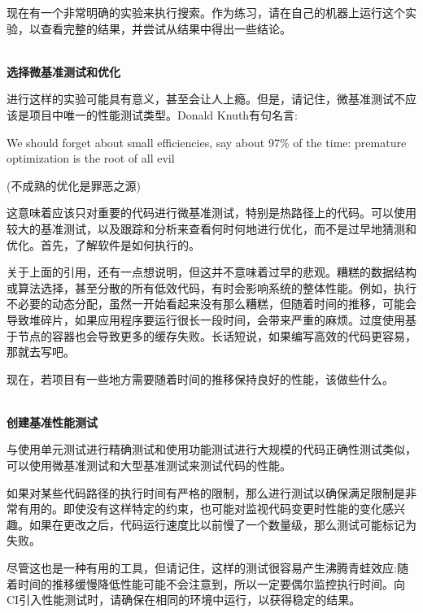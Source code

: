现在有一个非常明确的实验来执行搜索。作为练习，请在自己的机器上运行这个实验，以查看完整的结果，并尝试从结果中得出一些结论。

\hspace*{\fill} \\ %
\noindent
\textbf{选择微基准测试和优化}

进行这样的实验可能具有意义，甚至会让人上瘾。但是，请记住，微基准测试不应该是项目中唯一的性能测试类型。Donald Knuth有句名言:

\begin{center}
We should forget about small efficiencies, say about 97\% of the time: premature optimization is the root of all evil	

(不成熟的优化是罪恶之源)
\end{center}

这意味着应该只对重要的代码进行微基准测试，特别是热路径上的代码。可以使用较大的基准测试，以及跟踪和分析来查看何时何地进行优化，而不是过早地猜测和优化。首先，了解软件是如何执行的。

\begin{tcolorbox}[colback=blue!5!white,colframe=blue!75!black, title=Note]
\hspace*{0.7cm}关于上面的引用，还有一点想说明，但这并不意味着过早的悲观。糟糕的数据结构或算法选择，甚至分散的所有低效代码，有时会影响系统的整体性能。例如，执行不必要的动态分配，虽然一开始看起来没有那么糟糕，但随着时间的推移，可能会导致堆碎片，如果应用程序要运行很长一段时间，会带来严重的麻烦。过度使用基于节点的容器也会导致更多的缓存失败。长话短说，如果编写高效的代码更容易，那就去写吧。
\end{tcolorbox}

现在，若项目有一些地方需要随着时间的推移保持良好的性能，该做些什么。

\hspace*{\fill} \\ %
\noindent
\textbf{创建基准性能测试}

与使用单元测试进行精确测试和使用功能测试进行大规模的代码正确性测试类似，可以使用微基准测试和大型基准测试来测试代码的性能。

如果对某些代码路径的执行时间有严格的限制，那么进行测试以确保满足限制是非常有用的。即使没有这样特定的约束，也可能对监视代码变更时性能的变化感兴趣。如果在更改之后，代码运行速度比以前慢了一个数量级，那么测试可能标记为失败。

尽管这也是一种有用的工具，但请记住，这样的测试很容易产生沸腾青蛙效应:随着时间的推移缓慢降低性能可能不会注意到，所以一定要偶尔监控执行时间。向CI引入性能测试时，请确保在相同的环境中运行，以获得稳定的结果。


